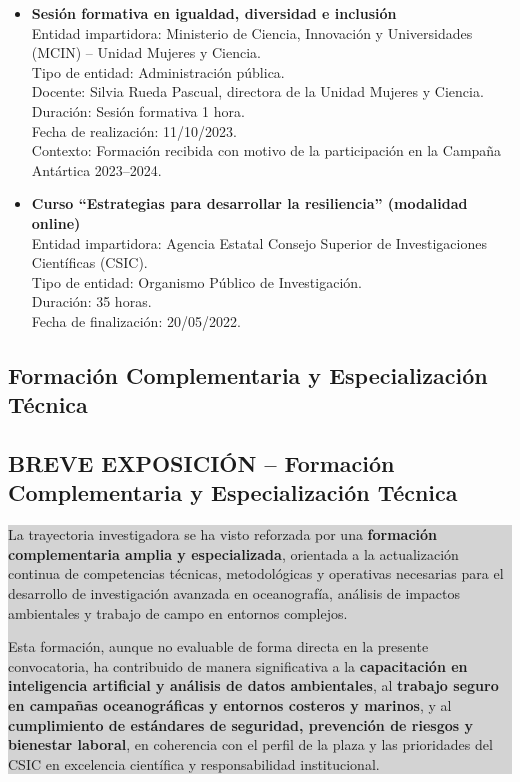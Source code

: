\documentclass[11pt,a4paper]{article}
\newcommand{\breveexposicion}[2]{
    \subsection*{\color{darkgray}\textbf{BREVE EXPOSICIÓN -- #1}}
    \vspace{0.3em}
    \noindent\colorbox{lightgray}{%
        \begin{minipage}{0.97\textwidth}
        \vspace{0.5em}
        \color{darkgray}
        #2
        \vspace{0.5em}
        \end{minipage}
    }
    \vspace{1em}
}
\begin{document}
\begin{itemize}[leftmargin=*]
    \item \textbf{Sesión formativa en igualdad, diversidad e inclusión}\\
Entidad impartidora: Ministerio de Ciencia, Innovación y Universidades (MCIN) – Unidad Mujeres y Ciencia.\\
Tipo de entidad: Administración pública.\\
Docente: Silvia Rueda Pascual, directora de la Unidad Mujeres y Ciencia.\\
Duración: Sesión formativa 1 hora.\\
Fecha de realización: 11/10/2023.\\
Contexto: Formación recibida con motivo de la participación en la Campaña Antártica 2023–2024.

    \item \textbf{Curso ``Estrategias para desarrollar la resiliencia'' (modalidad online)}\\
    Entidad impartidora: Agencia Estatal Consejo Superior de Investigaciones Científicas (CSIC).\\
    Tipo de entidad: Organismo Público de Investigación.\\
    Duración: 35 horas.\\
    Fecha de finalización: 20/05/2022.

\end{itemize}

\subsection{Formación Complementaria y Especialización Técnica}

\breveexposicion{Formación Complementaria y Especialización Técnica}{
La trayectoria investigadora se ha visto reforzada por una \textbf{formación complementaria amplia y especializada}, orientada a la actualización continua de competencias técnicas, metodológicas y operativas necesarias para el desarrollo de investigación avanzada en oceanografía, análisis de impactos ambientales y trabajo de campo en entornos complejos.

Esta formación, aunque no evaluable de forma directa en la presente convocatoria, ha contribuido de manera significativa a la \textbf{capacitación en inteligencia artificial y análisis de datos ambientales}, al \textbf{trabajo seguro en campañas oceanográficas y entornos costeros y marinos}, y al \textbf{cumplimiento de estándares de seguridad, prevención de riesgos y bienestar laboral}, en coherencia con el perfil de la plaza y las prioridades del CSIC en excelencia científica y responsabilidad institucional.
}
\end{document}
